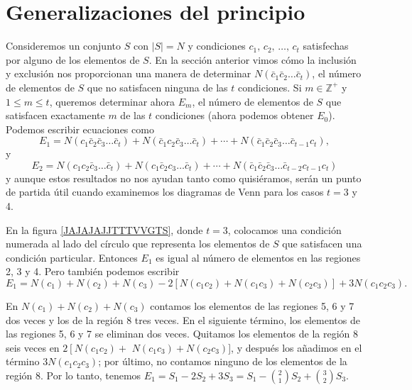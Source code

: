 \section{Generalizaciones del principio}

Consideremos un conjunto $S$ con $|S|=N$ y condiciones $c_1, \, c_2, \, \dots, \, c_t$ satisfechas por alguno de los elementos de $S$. En la sección anterior vimos cómo la inclusión y exclusión nos proporcionan una manera de determinar $N\left(\bar{c}_1 \bar{c}_2 \dots \bar{c}_t\right)$, el número de elementos de $S$ que no satisfacen ninguna de las $t$ condiciones. Si $m \in \mathbb{Z}^{+}$ y $1 \leq m \leq t$, queremos determinar ahora $E_m$, el número de elementos de $S$ que satisfacen exactamente $m$ de las $t$ condiciones (ahora podemos obtener $E_0$). Podemos escribir ecuaciones como
$$E_1=N\left(c_1 \bar{c}_2 \bar{c}_3 \dots \bar{c}_t\right)+N\left(\bar{c}_1 c_2 \bar{c}_3 \dots \bar{c}_t\right)+\cdots+N\left(\bar{c}_1 \bar{c}_2 \bar{c}_3 \dots \bar{c}_{t-1} c_t\right),$$
y
$$E_2=N\left(c_1 c_2 \bar{c}_3 \dots \bar{c}_t\right)+N\left(c_1 \bar{c}_2 c_3 \dots \bar{c}_t\right)+\cdots+N\left(\bar{c}_1 \bar{c}_2 \bar{c}_3 \dots \bar{c}_{t-2} c_{t-1} c_t\right)$$
y aunque estos resultados no nos ayudan tanto como quisiéramos, serán un punto de partida útil cuando examinemos los diagramas de Venn para los casos $t=3$ y 4.

En la figura \ref{JAJAJAJJTTTVVGTS}, donde $t=3$, colocamos una condición numerada al lado del círculo que representa los elementos de $S$ que satisfacen una condición particular. Entonces $E_1$ es igual al número de elementos en las regiones 2, 3 y 4. Pero también podemos escribir
$$E_1=N\left(c_1\right)+N\left(c_2\right)+N\left(c_3\right)-2\left[N\left(c_1 c_2\right)+N\left(c_1 c_3\right)+N\left(c_2 c_3\right)\right]+3 N\left(c_1 c_2 c_3\right).$$

En $N\left(c_1\right)+N\left(c_2\right)+N\left(c_3\right)$ contamos los elementos de las regiones 5, 6 y 7 dos veces y los de la región 8 tres veces. En el siguiente término, los elementos de las regiones 5, 6 y 7 se eliminan dos veces. Quitamos los elementos de la región 8 seis veces en $2\left[N\left(c_1 c_2\right)+\right.$ $N\left(c_1 c_3\right)+N\left(c_2 c_3\right)$], y después los añadimos en el término $3 N\left(c_1 c_2 c_3\right)$; por último, no contamos ninguno de los elementos de la región 8. Por lo tanto, tenemos $\displaystyle E_1=S_1-2 S_2+3 S_3=S_1 - \binom{2}{1}S_2 + \binom{3}{2}S_3$.

